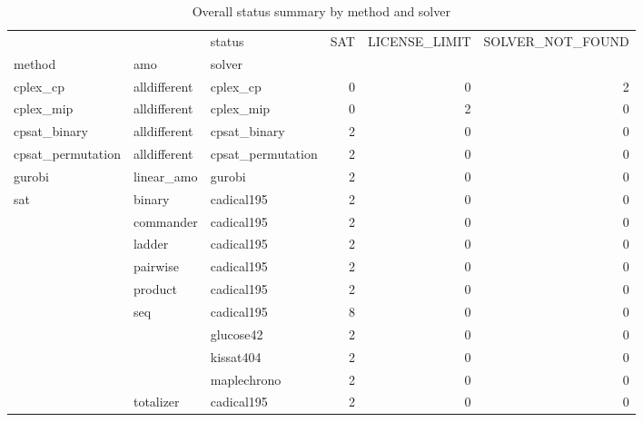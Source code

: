 \begin{table}
\caption{Overall status summary by method and solver}
\begin{tabular}{lllrrr}
\toprule
 &  & status & SAT & LICENSE_LIMIT & SOLVER_NOT_FOUND \\
method & amo & solver &  &  &  \\
\midrule
cplex_cp & alldifferent & cplex_cp & 0 & 0 & 2 \\
\cline{1-6} \cline{2-6}
cplex_mip & alldifferent & cplex_mip & 0 & 2 & 0 \\
\cline{1-6} \cline{2-6}
cpsat_binary & alldifferent & cpsat_binary & 2 & 0 & 0 \\
\cline{1-6} \cline{2-6}
cpsat_permutation & alldifferent & cpsat_permutation & 2 & 0 & 0 \\
\cline{1-6} \cline{2-6}
gurobi & linear_amo & gurobi & 2 & 0 & 0 \\
\cline{1-6} \cline{2-6}
\multirow[t]{10}{*}{sat} & binary & cadical195 & 2 & 0 & 0 \\
\cline{2-6}
 & commander & cadical195 & 2 & 0 & 0 \\
\cline{2-6}
 & ladder & cadical195 & 2 & 0 & 0 \\
\cline{2-6}
 & pairwise & cadical195 & 2 & 0 & 0 \\
\cline{2-6}
 & product & cadical195 & 2 & 0 & 0 \\
\cline{2-6}
 & \multirow[t]{4}{*}{seq} & cadical195 & 8 & 0 & 0 \\
 &  & glucose42 & 2 & 0 & 0 \\
 &  & kissat404 & 2 & 0 & 0 \\
 &  & maplechrono & 2 & 0 & 0 \\
\cline{2-6}
 & totalizer & cadical195 & 2 & 0 & 0 \\
\cline{1-6} \cline{2-6}
\bottomrule
\end{tabular}
\end{table}
